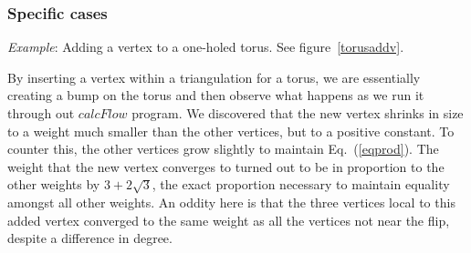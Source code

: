 \documentclass[12pt]{article}
\begin{document}
\subsubsection{Specific cases}

\noindent \textit{Example}: Adding a vertex to a one-holed torus. See figure~\ref{torusaddv}. \newline

\noindent By inserting a vertex within a triangulation for a torus, we are essentially creating a bump on the torus and then observe what happens as we run it through out $calcFlow$ program. We discovered that the new vertex shrinks in size to a weight much smaller than the other vertices, but to a positive constant. To counter this, the other vertices grow slightly to maintain Eq.~(\ref{eqprod}). The weight that the new vertex converges to turned out to be in proportion to the other weights by $3+2\sqrt{3}$, the exact proportion necessary to maintain equality amongst all other weights. An oddity here is that the three vertices local to this added vertex converged to the same weight as all the vertices not near the flip, despite a difference in degree.\newline
\end{document}
